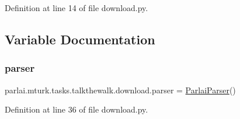 Definition at line 14 of file download.\+py.



\subsection{Variable Documentation}
\mbox{\label{namespaceparlai_1_1mturk_1_1tasks_1_1talkthewalk_1_1download_afc57e8bd20e5008ba31cf55a9d35df81}} 
\subsubsection{\texorpdfstring{parser}{parser}}
{\footnotesize\ttfamily parlai.\+mturk.\+tasks.\+talkthewalk.\+download.\+parser = \hyperlink{classparlai_1_1core_1_1params_1_1ParlaiParser}{Parlai\+Parser}()}



Definition at line 36 of file download.\+py.


